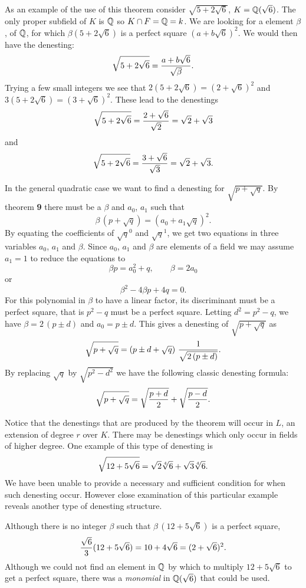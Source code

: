 As an example of the use of this theorem consider $\sqrt{5 + 2 \sqrt{6}}$,
$K = \mathbb{Q}(\sqrt{6})$.  The only proper subfield of $K$ is $\mathbb{Q}$
so $K \cap F = \mathbb{Q} = k$.  We are looking for a element $\beta$, of $\mathbb{Q}$, for 
which $\beta (5 + 2 \sqrt{6})$ is a perfect square $(a + b \sqrt{6})^2$.
We would then have the denesting: 
\[
\sqrt{5 + 2 \sqrt{6}} = {a + b \sqrt{6} \over \sqrt{\beta}}.
\]
Trying a few small integers we see that 
$2 (5 + 2 \sqrt{6}) = (2 + \sqrt{6})^2$ and 
$3 (5 + 2 \sqrt{6}) = (3 + \sqrt{6})^2$.
These lead to the denestings
\[
\sqrt{5 +2\sqrt{6}} ={2 + \sqrt{6} \over \sqrt{2}} = \sqrt{2} + \sqrt{3}
\]
and 
\[
\sqrt{5 +2\sqrt{6}} ={3 + \sqrt{6} \over \sqrt{3}} = \sqrt{2} + \sqrt{3}.
\]

In the general quadratic case we want to find a denesting for $\sqrt{p +
\sqrt{q}}$.    By theorem {\bf 9} there must be a $\beta$ and $a_0$,
$a_1$ such that 
\[
\beta\,(p + \sqrt{q}) = (a_0 + a_1 \sqrt{q})^2.
\]
By equating the coefficients of $\sqrt{q}^0$ and $\sqrt{q}^1$, we get
two equations in three variables $a_0$, $a_1$ and $\beta$.
Since $a_0$, $a_1$ and $\beta$ are elements of a field we may assume $a_1 = 1$
to reduce the equations to 
\[
\beta p = a_0^2 + q, \qquad \beta = 2 a_0
\]
or
\[
\beta^2 - 4 \beta p + 4 q = 0.
\]
For this polynomial in $\beta$ to have a linear factor, its discriminant
must be a perfect square, that is $p^2 - q$ must be a perfect square.   
Letting $d^2 = p^2 - q$, we have $\beta = 2\,(p \pm d)$ and 
$a_0 = p \pm d$.  This gives a denesting of $\sqrt{p + \sqrt{q}}$ as
\[
\sqrt{p + \sqrt{q}} = \left(p \pm d + \sqrt{q}\right) 
\,{1 \over \sqrt{2 \,(p \pm d)}}.
\]
By replacing $\sqrt{q}$ by $\sqrt{p^2 - d^2}$ we have the following
classic denesting formula: 
\[
\sqrt{p + \sqrt{q}} = \sqrt{p + d \over 2} +  \sqrt{p - d \over 2}.
\]

\medskip
Notice that the denestings that are produced by the theorem 
will occur in $L$, an extension of degree $r$ over $K$.  
There may be denestings which only occur in fields of higher degree.
One example of this type of denesting is
\[
\sqrt{12 + 5\sqrt{6}} = \sqrt{2} \root 4 \of 6 + \sqrt{3} \root 4 \of 6.
\]
We have been unable to provide a necessary and sufficient condition for
when such denesting occur.  However close examination of this particular
example reveals another type of denesting structure.

Although there is no integer $\beta$ such that $\beta\,(12 + 5 \sqrt{6})$
is a perfect square,
\[
{\sqrt{6} \over 3} (12 + 5 \sqrt{6}) = 10 + 4 \sqrt{6} = (2 + \sqrt{6})^2.
\]
Although we could not find an element in $\mathbb{Q}$ by which to multiply 
$12 + 5 \sqrt{6}$ to get a perfect square, there was a {\em monomial} in
$\mathbb{Q}(\sqrt{6})$ that could be used.

